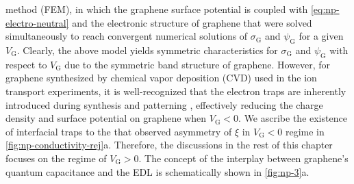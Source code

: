 method (FEM), in which the graphene surface potential is coupled with
\autoref{eq:np-electro-neutral} and the electronic structure of
graphene that were solved simultaneously to reach convergent numerical
solutions of $\sigma_{\mathrm{G}}$ and $\psi_{\mathrm{G}}$ for a given
$V_{\mathrm{G}}$. Clearly, the above model yields symmetric
characteristics for $\sigma_{\mathrm{G}}$ and $\psi_{\mathrm{G}}$ with
respect to $V_{\mathrm{G}}$ due to the symmetric band structure of
graphene.
%
However, for graphene
synthesized by chemical vapor deposition (CVD) used in the ion transport
experiments, it is well-recognized that the electron traps are
inherently introduced during synthesis and patterning
\autocite{Dean_2010_BN_gr_highquality}, effectively reducing the charge
density and surface potential on graphene when $V_{\mathrm{G}}<0$.
%
We ascribe the existence of interfacial traps to the
that observed asymmetry of $\xi$ in  $V_{\mathrm{G}}<0$ regime
in \autoref{fig:np-conductivity-rej}a.
%
%
Therefore, the discussions in the rest of this chapter focuses on the
regime of $V_{\mathrm{G}}>0$. The concept of the interplay between graphene's quantum capacitance and the EDL is schematically shown in \autoref{fig:np-3}a.


